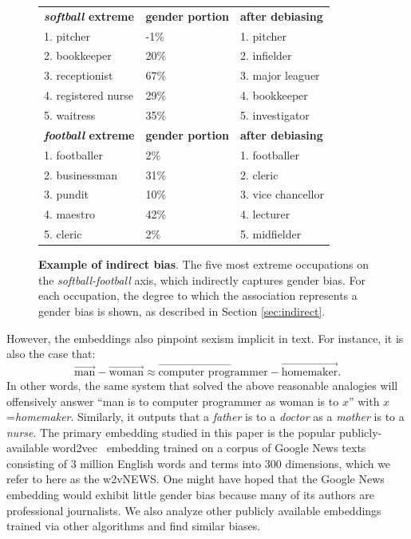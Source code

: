 \documentclass{article}
\begin{document}
\begin{figure}
\begin{tabular}{lll}
   {\bf {\em softball} extreme}	&{\bf gender portion} &{\bf after debiasing}	\\
   1. pitcher	&-1\% 	& 1. pitcher      \\
   2. bookkeeper	&20\%	&2. infielder		\\
   3. receptionist	&67\%	&3. major leaguer		\\
   4. registered nurse	&29\%	&4. bookkeeper		\\
   5. waitress	&35\%	&5. investigator		\\ [2ex]
    

   {\bf {\em football} extreme}	&{\bf gender portion} &{\bf after debiasing} \\
   1. footballer	&2\%	&1. footballer	\\
   2. businessman	&31\%	&2. cleric	\\
   3. pundit	&10\%	&3. vice chancellor	\\
   4. maestro	&42\%	&4. lecturer	\\
   5. cleric	&2\%	&5. midfielder	\\
\end{tabular}
\caption{\textbf{Example of indirect bias}. The five most extreme occupations on the {\em softball-football} axis, which indirectly captures gender bias. For each occupation, the degree to which the association represents a gender bias is shown, as described in Section \ref{sec:indirect}.
\label{fig:occupation_associations2}
}
\end{figure}

However, the embeddings also pinpoint sexism implicit in text. For instance, it is also the case that:
\[
\overrightarrow{\text{man}}-\overrightarrow{\text{woman}}\approx \overrightarrow{\text{computer programmer}}-\overrightarrow{\text{homemaker}}.
\]
In other words, the same system that solved the above reasonable analogies will offensively answer ``man is to computer programmer as woman is to $x$'' with $x$=\textit{homemaker}. Similarly, it outputs that a {\em father} is to a {\em doctor} as a \textit{mother} is to a \textit{nurse}. The primary embedding studied in this paper is the popular publicly-available word2vec~\cite{MCCD13,MSCCD13} embedding trained on a corpus of Google News texts consisting of 3 million English words and terms into 300 dimensions, which we refer to here as the w2vNEWS. One might have hoped that the Google News embedding would exhibit little gender bias because many of its authors are professional journalists. We also analyze other publicly available embeddings trained via other algorithms and find similar biases.
\end{document}

